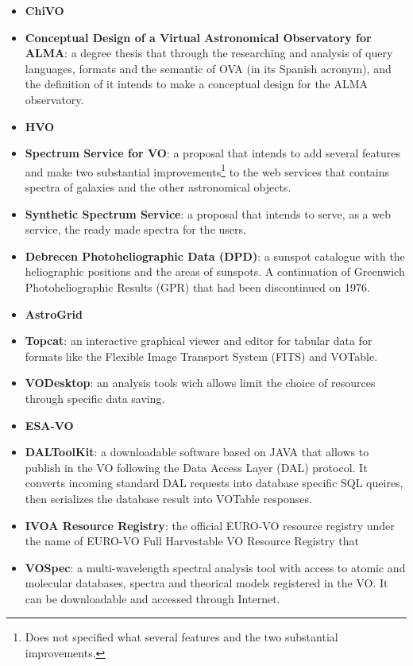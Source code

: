 \begin{itemize}
\item \textbf{ChiVO}
\item \textbf{Conceptual Design of a Virtual Astronomical Observatory for ALMA}:
a degree thesis that through the researching and analysis of query languages,
formats and the semantic of OVA (in its Spanish acronym), and the definition of
it intends to make a conceptual design for the ALMA observatory.

\item \textbf{HVO}
\item \textbf{Spectrum Service for VO}:
a proposal that intends to add several features and make two substantial
improvements\footnote{Does not specified what several features and the two
substantial improvements.} to the web services that contains spectra of galaxies
and the other astronomical objects.

\item \textbf{Synthetic Spectrum Service}:
a proposal that intends to serve, as a web service, the ready made spectra for
the users.

\item \textbf{Debrecen Photoheliographic Data (DPD)}:
a sunspot catalogue with the heliographic positions and the areas of sunspots. A
continuation of Greenwich Photoheliographic Results (GPR) that had been
discontinued on 1976.

\item \textbf{AstroGrid}
\item \textbf{Topcat}:
an interactive graphical viewer and editor for tabular data for formats like the
Flexible Image Transport System (FITS) and VOTable.

\item \textbf{VODesktop}:
an analysis tools wich allows limit the choice of resources through specific
data saving.

\item \textbf{ESA-VO}
\item \textbf{DALToolKit}:
a downloadable software based on JAVA that allows to publish in the VO following
the Data Access Layer (DAL) protocol. It converts incoming standard DAL requests
into database specific SQL queires, then serializes the database result into
VOTable responses. 

\item \textbf{IVOA Resource Registry}:
the official EURO-VO resource registry under the name of EURO-VO Full
Harvestable VO Resource Registry that 

\item \textbf{VOSpec}:
a multi-wavelength spectral analysis tool with access to atomic and molecular
databases, spectra and theorical models registered in the VO. It can be
downloadable and accessed through Internet.


\end{itemize}

